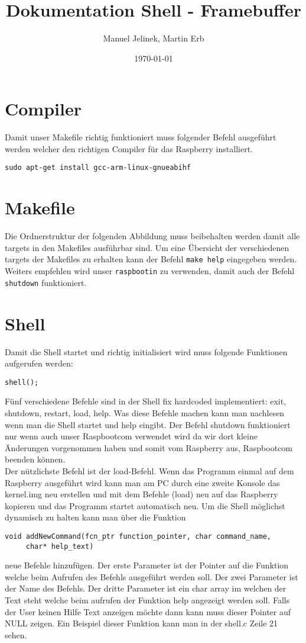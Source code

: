 \documentclass[a4paper,10pt]{scrartcl}
\title{Dokumentation Shell - Framebuffer}
\author{Manuel Jelinek, Martin Erb}
\date{\today}
\begin{document}
\maketitle
\section*{Compiler}
Damit unser Makefile richtig funktioniert muss folgender Befehl ausgeführt
werden welcher den richtigen Compiler für das Raspberry installiert.
\begin{verbatim} 
sudo apt-get install gcc-arm-linux-gnueabihf 
\end{verbatim}
\section*{Makefile}
Die Ordnerstruktur der folgenden Abbildung muss beibehalten werden damit
alle targets in den Makefiles ausführbar sind. Um eine Übersicht der
verschiedenen targets der Makefiles zu erhalten kann der Befehl \texttt{make
help} eingegeben werden.\\
Weiters empfehlen wird unser \texttt{raspbootin} zu verwenden, damit auch der 
Befehl \texttt{shutdown} funktioniert.
\newline

\section*{Shell}
Damit die Shell startet und richtig initialisiert wird muss folgende
Funktionen aufgerufen werden:
\begin{verbatim} 
shell();
\end{verbatim}
Fünf verschiedene Befehle sind in der Shell fix hardcoded implementiert:
exit, shutdown, restart, load, help.
Was diese Befehle machen kann man nachlesen wenn man die Shell startet und
help eingibt.
Der Befehl shutdown funktioniert nur wenn auch unser Raspbootcom verwendet wird
da wir dort kleine Änderungen vorgenommen
haben und somit vom Raspberry aus, Raspbootcom beenden können.\\
Der nützlichste Befehl ist der load-Befehl. Wenn das Programm einmal auf dem
Raspberry ausgeführt wird kann man am
PC durch eine zweite Konsole das kernel.img neu erstellen und mit dem Befehle
(load) neu auf das Raspberry kopieren und 
das Programm startet automatisch neu.
Um die Shell möglichst dynamisch zu halten kann man über die Funktion
\begin{verbatim} 
void addNewCommand(fcn_ptr function_pointer, char command_name,
     char* help_text)
\end{verbatim}
neue Befehle hinzufügen. Der erste Parameter ist der Pointer auf die Funktion
welche beim Aufrufen des Befehls ausgeführt werden soll.
Der zwei Parameter ist der Name des Befehls. Der dritte Parameter ist ein char
array im welchen der Text steht welche beim aufrufen der Funktion
help angezeigt werden soll. Falls der User keinen Hilfe Text anzeigen möchte
dann kann muss dieser Pointer auf NULL zeigen.
Ein Beispiel dieser Funktion kann man in der shell.c Zeile 21 sehen.
\end{document}
